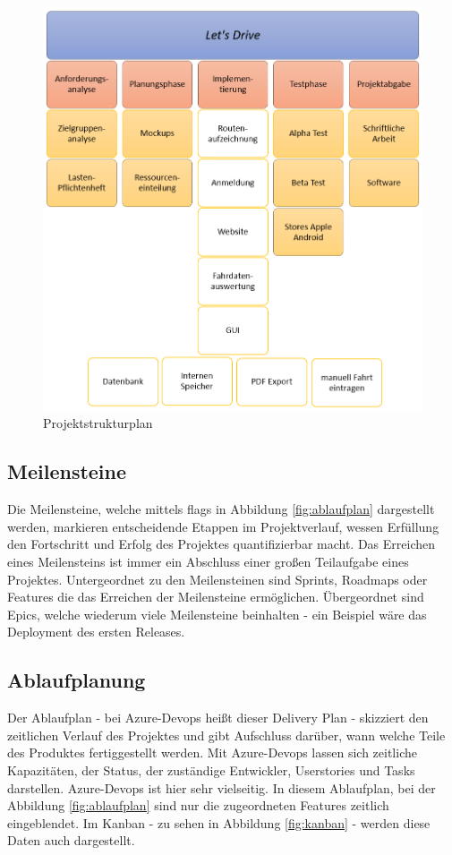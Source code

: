 \begin{figure}[H]
	\centering
	\includegraphics[width=\textwidth,height=\textheight,keepaspectratio]{figures/ProjektStrukturPlan.png}
	\caption{Projektstrukturplan}
	\label{fig:projektstrukturplan}
\end{figure}

\subsection{Meilensteine}
Die Meilensteine, welche mittels flags in Abbildung \ref{fig:ablaufplan} dargestellt werden, markieren entscheidende Etappen im Projektverlauf, wessen Erfüllung den Fortschritt und Erfolg des Projektes quantifizierbar macht. Das Erreichen eines Meilensteins ist immer ein Abschluss einer großen Teilaufgabe eines Projektes. Untergeordnet zu den Meilensteinen sind Sprints, Roadmaps oder Features die das Erreichen der Meilensteine ermöglichen. Übergeordnet sind Epics, welche wiederum viele Meilensteine beinhalten - ein Beispiel wäre das Deployment des ersten Releases.


\subsection{Ablaufplanung}
Der Ablaufplan - bei Azure-Devops heißt dieser Delivery Plan - skizziert den zeitlichen Verlauf des Projektes und gibt Aufschluss darüber, wann welche Teile des Produktes fertiggestellt werden. Mit Azure-Devops lassen sich zeitliche Kapazitäten, der Status, der zuständige Entwickler, Userstories und Tasks darstellen. Azure-Devops ist hier sehr vielseitig. In diesem Ablaufplan, bei der Abbildung \ref{fig:ablaufplan} sind nur die zugeordneten Features zeitlich eingeblendet. Im Kanban - zu sehen in Abbildung \ref{fig:kanban} - werden diese Daten auch dargestellt.

